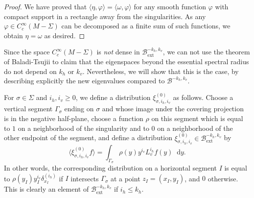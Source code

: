\documentclass[JEP,XML,SOM,Unicode]{cedram}
\newcommand{\ext}{\mathrm{ext}}
\newcommand{\boB}{\mathcal{B}}
\newcommand{\dd}{\mathop{}\!\mathrm{d}}
\let\phi\varphi
\theoremstyle{definition}
\numberwithin{equation}{section}
\begin{document}
\begin{proof}
We have proved that $\langle \eta, \phi \rangle = \langle \omega, \phi
\rangle$ for any smooth function $\phi$ with compact support in a rectangle
away from the singularities. As any $\phi \in C^\infty_c(M-\Sigma)$ can be
decomposed as a finite sum of such functions, we obtain $\eta = \omega$ as
desired.
\end{proof}

Since the space $C^\infty_c(M-\Sigma)$ is \emph{not} dense in
$\boB^{-k_h,k_v}_{\ext}$, we can not use the theorem of Baladi-Tsujii to claim
that the eigenspaces beyond the essential spectral radius do not depend on
$k_h$ or $k_v$. Nevertheless, we will show that this is the case, by
describing explicitly the new eigenvalues compared to $\boB^{-k_h, k_v}$.

For $\sigma \in \Sigma$ and $i_h, i_v \geq 0$, we define a distribution
$\xi^{(0)}_{\sigma, i_h, i_v}$ as follows. Choose a vertical segment
$\Gamma_\sigma$ ending on $\sigma$ and whose image under the covering
projection is in the negative half-plane, choose a function $\rho$ on this
segment which is equal to $1$ on a neighborhood of the singularity and to $0$
on a neighborhood of the other endpoint of the segment, and define a
distribution $\xi^{(0)}_{\sigma, i_h, i_v} \in \boB_{\ext}^{-k_h, k_v}$ by
\[
\langle \xi^{(0)}_{\sigma, i_h, i_v} f\rangle = \int_{\Gamma_\sigma}
\rho(y)y^{i_v} L_v^{i_h} f(y)\dd y.
\]
In other words, the corresponding
distribution on a horizontal segment $I$ is equal to $\rho(y_I) y_I^{i_v}
\delta^{(i_h)}_{x_I}$ if $I$ intersects $\Gamma_\sigma$ at a point $z_I=(x_I,
y_I)$, and $0$ otherwise. This is clearly an element of $\boB_{\ext}^{-k_h,
k_v}$ if $i_h \leq k_h$.
\end{document}
